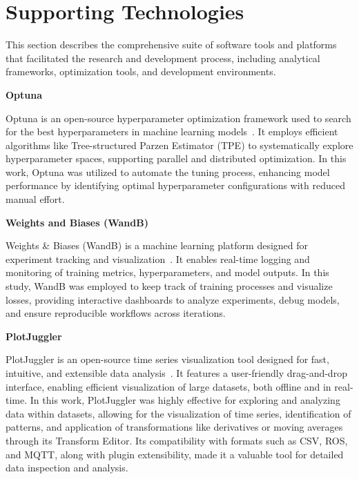 

\section{Supporting Technologies}

This section describes the comprehensive suite of software tools and platforms that facilitated the research and development process, including analytical frameworks, optimization tools, and development environments.


\textbf{Optuna}

Optuna is an open-source hyperparameter optimization framework used to search for the best hyperparameters in machine learning models~\cite{akiba_optuna_2019}. It employs efficient algorithms like Tree-structured Parzen Estimator (TPE) to systematically explore hyperparameter spaces, supporting parallel and distributed optimization. In this work, Optuna was utilized to automate the tuning process, enhancing model performance by identifying optimal hyperparameter configurations with reduced manual effort.

\textbf{Weights and Biases (WandB)}

Weights \& Biases (WandB) is a machine learning platform designed for experiment tracking and visualization~\cite{noauthor_weights_nodate}. It enables real-time logging and monitoring of training metrics, hyperparameters, and model outputs. In this study, WandB was employed to keep track of training processes and visualize losses, providing interactive dashboards to analyze experiments, debug models, and ensure reproducible workflows across iterations.

\textbf{PlotJuggler}

PlotJuggler is an open-source time series visualization tool designed for fast, intuitive, and extensible data analysis~\cite{faconti_facontidavideplotjuggler_2025}. It features a user-friendly drag-and-drop interface, enabling efficient visualization of large datasets, both offline and in real-time. In this work, PlotJuggler was highly effective for exploring and analyzing data within datasets, allowing for the visualization of time series, identification of patterns, and application of transformations like derivatives or moving averages through its Transform Editor. Its compatibility with formats such as CSV, ROS, and MQTT, along with plugin extensibility, made it a valuable tool for detailed data inspection and analysis.


